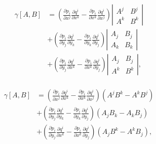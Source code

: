 \documentclass[a4paper,10pt]{article}
\numberwithin{equation}{section}
\begin{document}
\begin{align}
\begin{split}
 \gamma[A,B] &= \left(\frac{\partial p_i}{\partial x^j}\frac{\partial q^i}{\partial x^k} 
 - \frac{\partial p_i}{\partial x^k}\frac{\partial q^i}{\partial x^j}\right)\left|\begin{matrix}
                                                                             A^j & B^j \\
                                                                             A^k & B^k
                                                                            \end{matrix}\right| \\
 &+ \left(\frac{\partial p_i}{\partial y_j}\frac{\partial q^i}{\partial y_k} 
 - \frac{\partial p_i}{\partial y_k}\frac{\partial q^i}{\partial y_j}\right)\left|\begin{matrix}
                                                                             A_j & B_j \\
                                                                             A_k & B_k
                                                                            \end{matrix}\right| \\
 &+ \left(\frac{\partial p_i}{\partial y_j}\frac{\partial q^i}{\partial x^k} 
 - \frac{\partial p_i}{\partial x^k}\frac{\partial q^i}{\partial y_j}\right)\left|\begin{matrix}
                                                                             A_j & B_j \\
                                                                             A^k & B^k
                                                                            \end{matrix}\right|,
\end{split}
\end{align}

\begin{align}
\begin{split}
 \gamma[A,B] &= \left(\frac{\partial p_i}{\partial x^j}\frac{\partial q^i}{\partial x^k} 
 - \frac{\partial p_i}{\partial x^k}\frac{\partial q^i}{\partial x^j}\right)(A^jB^k - A^kB^j) \\
 &+ \left(\frac{\partial p_i}{\partial y_j}\frac{\partial q^i}{\partial y_k} 
 - \frac{\partial p_i}{\partial y_k}\frac{\partial q^i}{\partial y_j}\right)(A_jB_k - A_kB_j) \\
 &+  \left(\frac{\partial p_i}{\partial y_j}\frac{\partial q^i}{\partial x^k} 
 - \frac{\partial p_i}{\partial x^k}\frac{\partial q^i}{\partial y_j}\right)(A_jB^k - A^kB_j),
\end{split}
\end{align}
\end{document}
